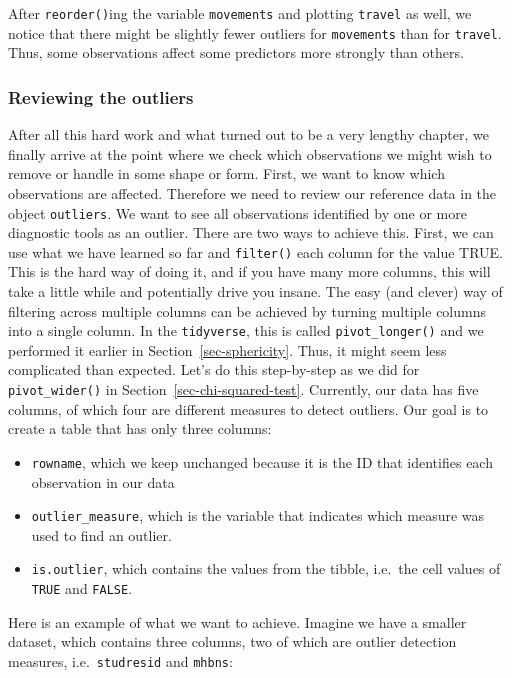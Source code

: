 \documentclass[
  letterpaper,
]{krantz}
\begin{document}
After \texttt{reorder()}ing the variable \texttt{movements} and plotting
\texttt{travel} as well, we notice that there might be slightly fewer
outliers for \texttt{movements} than for \texttt{travel}. Thus, some
observations affect some predictors more strongly than others.

\subsubsection{Reviewing the outliers}\label{sec-reviewing-the-outliers}

After all this hard work and what turned out to be a very lengthy
chapter, we finally arrive at the point where we check which
observations we might wish to remove or handle in some shape or form.
First, we want to know which observations are affected. Therefore we
need to review our reference data in the object \texttt{outliers}. We
want to see all observations identified by one or more diagnostic tools
as an outlier. There are two ways to achieve this. First, we can use
what we have learned so far and \texttt{filter()} each column for the
value TRUE. This is the hard way of doing it, and if you have many more
columns, this will take a little while and potentially drive you insane.
The easy (and clever) way of filtering across multiple columns can be
achieved by turning multiple columns into a single column. In the
\texttt{tidyverse}, this is called \texttt{pivot\_longer()} and we
performed it earlier in Section~\ref{sec-sphericity}. Thus, it might
seem less complicated than expected. Let's do this step-by-step as we
did for \texttt{pivot\_wider()} in Section~\ref{sec-chi-squared-test}.
Currently, our data has five columns, of which four are different
measures to detect outliers. Our goal is to create a table that has only
three columns:

\begin{itemize}
\item
  \texttt{rowname}, which we keep unchanged because it is the ID that
  identifies each observation in our data
\item
  \texttt{outlier\_measure}, which is the variable that indicates which
  measure was used to find an outlier.
\item
  \texttt{is.outlier}, which contains the values from the tibble,
  i.e.~the cell values of \texttt{TRUE} and \texttt{FALSE}.
\end{itemize}

Here is an example of what we want to achieve. Imagine we have a smaller
dataset, which contains three columns, two of which are outlier
detection measures, i.e.~\texttt{studresid} and \texttt{mhbns}:
\end{document}
